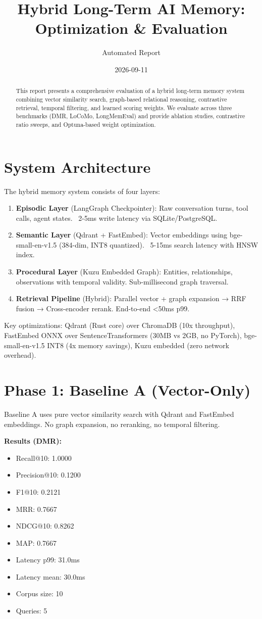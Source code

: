 \documentclass[11pt]{article}
\title{Hybrid Long-Term AI Memory: Optimization \& Evaluation}
\author{Automated Report}
\date{2026-09-11}
\begin{document}
\maketitle
\begin{abstract}
This report presents a comprehensive evaluation of a hybrid long-term memory system combining vector similarity search, graph-based relational reasoning, contrastive retrieval, temporal filtering, and learned scoring weights. We evaluate across three benchmarks (DMR, LoCoMo, LongMemEval) and provide ablation studies, contrastive ratio sweeps, and Optuna-based weight optimization.
\end{abstract}
\tableofcontents
\newpage
\section{System Architecture}
The hybrid memory system consists of four layers:

\begin{enumerate}
\item \textbf{Episodic Layer} (LangGraph Checkpointer): Raw conversation turns, tool calls, agent states. ~2-5ms write latency via SQLite/PostgreSQL.
\item \textbf{Semantic Layer} (Qdrant + FastEmbed): Vector embeddings using bge-small-en-v1.5 (384-dim, INT8 quantized). ~5-15ms search latency with HNSW index.
\item \textbf{Procedural Layer} (Kuzu Embedded Graph): Entities, relationships, observations with temporal validity. Sub-millisecond graph traversal.
\item \textbf{Retrieval Pipeline} (Hybrid): Parallel vector + graph expansion → RRF fusion → Cross-encoder rerank. End-to-end <50ms p99.
\end{enumerate}

Key optimizations: Qdrant (Rust core) over ChromaDB (10x throughput), FastEmbed ONNX over SentenceTransformers (30MB vs 2GB, no PyTorch), bge-small-en-v1.5 INT8 (4x memory savings), Kuzu embedded (zero network overhead).

\section{Phase 1: Baseline A (Vector-Only)}
Baseline A uses pure vector similarity search with Qdrant and FastEmbed embeddings. No graph expansion, no reranking, no temporal filtering.

\textbf{Results (DMR):}
\begin{itemize}
\item Recall@10: 1.0000
\item Precision@10: 0.1200
\item F1@10: 0.2121
\item MRR: 0.7667
\item NDCG@10: 0.8262
\item MAP: 0.7667
\item Latency p99: 31.0ms
\item Latency mean: 30.0ms
\item Corpus size: 10
\item Queries: 5
\end{itemize}
\end{document}
